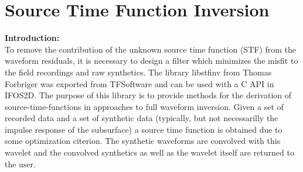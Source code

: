 \chapter{\label{cha:STF-Inversion}Source Time Function Inversion}
\textbf{Introduction:}\\
To remove the contribution of the unknown source time function (STF) from the waveform residuals, it is necessary to design a filter which minimizes the misfit to the field recordings and raw synthetics. The library libstfinv from Thomas Forbriger was exported from TFSoftware and can be used with a C API in IFOS2D. The purpose of this library is to provide methods for the derivation of source-time-functions in approaches to full waveform inversion. Given a set of recorded data and a set of synthetic data (typically, but not necessarilly the impulse response of the subsurface) a source time function is obtained due to some optimization citerion. The synthetic waveforms are convolved with this wavelet and the convolved synthetics as well as the wavelet itself are returned to the user.

